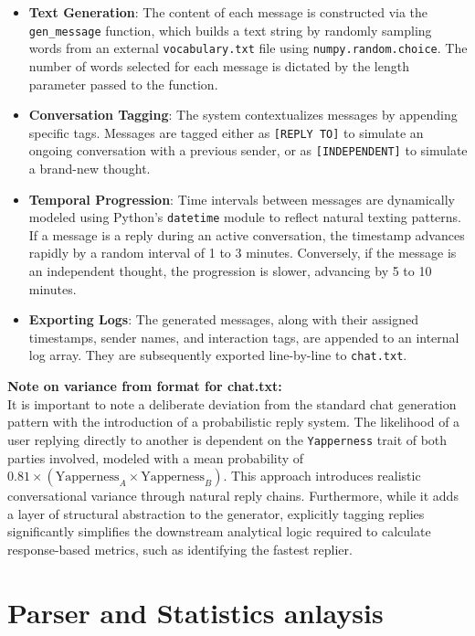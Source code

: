 \documentclass[12pt]{article}
\begin{document}
\begin{itemize}
    \item \textbf{Text Generation}: The content of each message is constructed via the \texttt{gen\_message} function, which builds a text string by randomly sampling words from an external \texttt{vocabulary.txt} file using \texttt{numpy.random.choice}. The number of words selected for each message is dictated by the length parameter passed to the function.
    \item \textbf{Conversation Tagging}: The system contextualizes messages by appending specific tags. Messages are tagged either as \texttt{[REPLY TO]} to simulate an ongoing conversation with a previous sender, or as \texttt{[INDEPENDENT]} to simulate a brand-new thought.
    \item \textbf{Temporal Progression}: Time intervals between messages are dynamically modeled using Python's \texttt{datetime} module to reflect natural texting patterns. If a message is a reply during an active conversation, the timestamp advances rapidly by a random interval of 1 to 3 minutes. Conversely, if the message is an independent thought, the progression is slower, advancing by 5 to 10 minutes.
    \item \textbf{Exporting Logs}: The generated messages, along with their assigned timestamps, sender names, and interaction tags, are appended to an internal log array. They are subsequently exported line-by-line to \texttt{chat.txt}.
\end{itemize}

\vspace{1em}
\noindent\textbf{Note on variance from format for \textbf{chat.txt}:} \\
It is important to note a deliberate deviation from the standard chat generation pattern with the introduction of a probabilistic reply system. The likelihood of a user replying directly to another is dependent on the \texttt{Yapperness} trait of both parties involved, modeled with a mean probability of $0.81 \times (\text{Yapperness}_A \times \text{Yapperness}_B)$. This approach introduces realistic conversational variance through natural reply chains. Furthermore, while it adds a layer of structural abstraction to the generator, explicitly tagging replies significantly simplifies the downstream analytical logic required to calculate response-based metrics, such as identifying the fastest replier.
\section{Parser and Statistics anlaysis}
\end{document}
